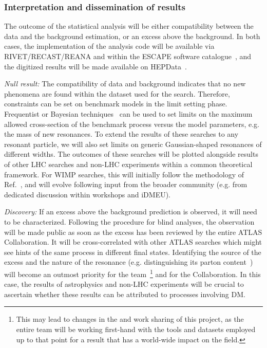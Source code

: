 \subsubsection{Interpretation and dissemination of results} The outcome of the statistical analysis will be either compatibility between the data and the background estimation, or an excess above the background. In both cases, the implementation of the analysis code will be available via RIVET/RECAST/REANA 
and within the ESCAPE software catalogue~\cite{ToBeCited}, 
and the digitized results will be made available on HEPData~\cite{ToBeCited}. %

\textit{Null result:} The compatibility of data and background indicates that no new phenomena are found within the dataset used for the search. 
Therefore, constraints can be set on benchmark models in the limit setting phase. 
Frequentist or Bayesian techniques~\cite{ToBeCited} %
can be used to set limits on the maximum allowed cross-section of the benchmark process versus the model parameters, e.g. the mass of new resonances.
To extend the results of these searches to any resonant particle, we will also set limits on generic Gaussian-shaped resonances of different widths.
The outcomes of these searches will be plotted alongside results of other LHC searches and non-LHC experiments within a common theoretical framework. 
For WIMP searches, this will initially follow the methodology of Ref.~\cite{ToBeCited}, %
and will evolve following input from the broader community (e.g. from dedicated discussion within workshops and iDMEU). 

\textit{Discovery:} If an excess above the background prediction is observed, it will need to be characterized. 
Following the procedure for blind analyses, the observation will be made public as soon as the excess has been reviewed by the entire ATLAS Collaboration. 
It will be cross-correlated with other ATLAS searches which might see hints of the same process in different final states. 
Identifying the source of the excess and the nature of the resonance (e.g. distinguishing its parton content~\cite{ToBeCited}) %
will become an outmost priority for the team~\footnote{This may lead to changes in the and work sharing of this project, as the entire team will be working first-hand with the tools and datasets employed up to that point for a result that has a world-wide impact on the field.} and for the Collaboration. 
In this case, the results of astrophysics and non-LHC experiments will be crucial to ascertain whether these results can be attributed to processes involving DM.


